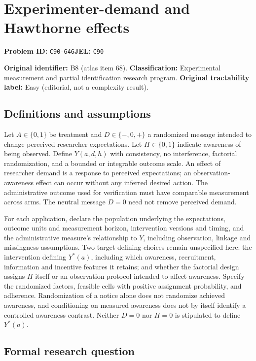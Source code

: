 \documentclass[11pt,a4paper]{article}
\begin{document}
\section*{Experimenter-demand and Hawthorne effects}
\textbf{Problem ID:} \texttt{C90-646}\quad \textbf{JEL:} \texttt{C90}\par
\label{problem:OP-0068}
\label{atlas:prob:B8}

\noindent\textbf{Original identifier:} B8 (atlas item 68). \textbf{Classification:} Experimental measurement and partial identification research program. \textbf{Original tractability label:} Easy (editorial, not a complexity result).

\subsection*{Definitions and assumptions}

Let $A\in\{0,1\}$ be treatment and $D\in\{-,0,+\}$ a randomized message intended to change perceived researcher expectations. Let $H\in\{0,1\}$ indicate awareness of being observed. Define $Y(a,d,h)$ with consistency, no interference, factorial randomization, and a bounded or integrable outcome scale. An effect of researcher demand is a response to perceived expectations; an observation-awareness effect can occur without any inferred desired action. The administrative outcome used for verification must have comparable measurement across arms. The neutral message $D=0$ need not remove perceived demand.

For each application, declare the population underlying the expectations, outcome units and measurement horizon, intervention versions and timing, and the administrative measure's relationship to $Y$, including observation, linkage and missingness assumptions. Two target-defining choices remain unspecified here: the intervention defining $Y^*(a)$, including which awareness, recruitment, information and incentive features it retains; and whether the factorial design assigns $H$ itself or an observation protocol intended to affect awareness. Specify the randomized factors, feasible cells with positive assignment probability, and adherence. Randomization of a notice alone does not randomize achieved awareness, and conditioning on measured awareness does not by itself identify a controlled awareness contrast. Neither $D=0$ nor $H=0$ is stipulated to define $Y^*(a)$.

\subsection*{Formal research question}
\end{document}
